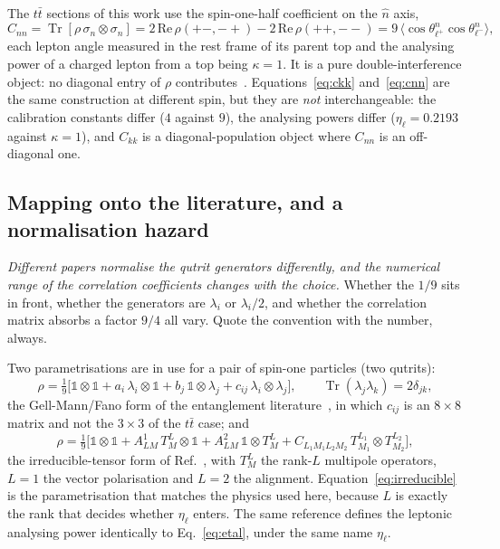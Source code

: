 \documentclass[a4paper,11pt]{article}
\providecommand{\Tr}{\operatorname{Tr}}
\providecommand{\etal}{\ensuremath{\eta_\ell}}          %
\providecommand{\ckk}{\ensuremath{C_{kk}}}              %
\providecommand{\cnn}{\ensuremath{C_{nn}}}              %
\begin{document}
The $t\bar t$ sections of this work use the spin-one-half coefficient on the
$\hat n$ axis,
\begin{equation}
  \cnn=\Tr\!\left[\rho\,\sigma_n\otimes\sigma_n\right]
      =2\,\mathrm{Re}\,\rho(+-,-+)-2\,\mathrm{Re}\,\rho(++,--)
      =9\,\big\langle\cos\theta^n_{\ell^+}\cos\theta^n_{\ell^-}\big\rangle ,
  \label{eq:cnn}
\end{equation}
each lepton angle measured in the rest frame of its parent top and the
analysing power of a charged lepton from a top being $\kappa=1$. It is a pure
double-interference object: no diagonal entry of $\rho$
contributes~\cite{Bernreuther:2015yna}. Equations~\eqref{eq:ckk}
and~\eqref{eq:cnn} are the same construction at different spin, but they are
\emph{not} interchangeable: the calibration constants differ ($4$ against $9$),
the analysing powers differ ($\etal=0.2193$ against $\kappa=1$), and $\ckk$ is
a diagonal-population object where $\cnn$ is an off-diagonal one.

\subsection{Mapping onto the literature, and a normalisation hazard}
\label{subsec:spinobs_dictionary}

\emph{Different papers normalise the qutrit generators differently, and the
numerical range of the correlation coefficients changes with the choice.}
Whether the $1/9$ sits in front, whether the generators are $\lambda_i$ or
$\lambda_i/2$, and whether the correlation matrix absorbs a factor $9/4$ all
vary. Quote the convention with the number, always.

Two parametrisations are in use for a pair of spin-one particles (two qutrits):
\begin{equation}
  \rho=\tfrac19\Big[\mathbb{1}\otimes\mathbb{1}
    +a_i\,\lambda_i\otimes\mathbb{1}
    +b_j\,\mathbb{1}\otimes\lambda_j
    +c_{ij}\,\lambda_i\otimes\lambda_j\Big],
  \qquad \Tr(\lambda_j\lambda_k)=2\delta_{jk},
  \label{eq:fano}
\end{equation}
the Gell-Mann/Fano form of the entanglement
literature~\cite{Ashby-Pickering:2022umy,Barr:2024djo,Fabbrichesi:2023cev},
in which $c_{ij}$ is an $8\times8$ matrix and not the $3\times3$ of the $t\bar
t$ case; and
\begin{equation}
  \rho=\tfrac19\Big[\mathbb{1}\otimes\mathbb{1}
    +A^1_{LM}\,T^L_M\otimes\mathbb{1}
    +A^2_{LM}\,\mathbb{1}\otimes T^L_M
    +C_{L_1M_1L_2M_2}\,T^{L_1}_{M_1}\otimes T^{L_2}_{M_2}\Big],
  \label{eq:irreducible}
\end{equation}
the irreducible-tensor form of Ref.~\cite{Aguilar-Saavedra:2022wam}, with
$T^L_M$ the rank-$L$ multipole operators, $L=1$ the vector polarisation and
$L=2$ the alignment. Equation~\eqref{eq:irreducible} is the parametrisation
that matches the physics used here, because $L$ is exactly the rank that
decides whether $\etal$ enters. The same reference defines the leptonic
analysing power identically to Eq.~\eqref{eq:etal}, under the same name
$\etal$.
\end{document}
